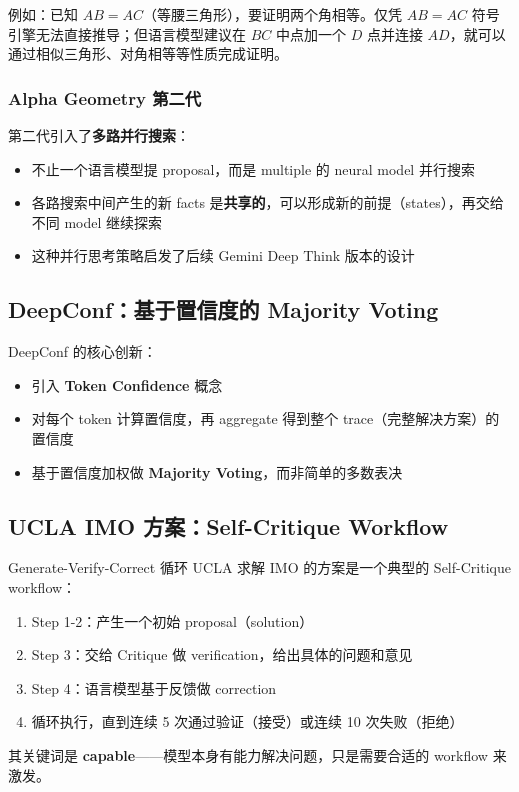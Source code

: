 \documentclass[a4paper]{article}
\begin{document}
例如：已知 $AB = AC$（等腰三角形），要证明两个角相等。仅凭 $AB = AC$ 符号引擎无法直接推导；但语言模型建议在 $BC$ 中点加一个 $D$ 点并连接 $AD$，就可以通过相似三角形、对角相等等性质完成证明。

\subsubsection{Alpha Geometry 第二代}

第二代引入了\textbf{多路并行搜索}：
\begin{itemize}
    \item 不止一个语言模型提 proposal，而是 multiple 的 neural model 并行搜索
    \item 各路搜索中间产生的新 facts 是\textbf{共享的}，可以形成新的前提（states），再交给不同 model 继续探索
    \item 这种并行思考策略启发了后续 Gemini Deep Think 版本的设计
\end{itemize}

\subsection{DeepConf：基于置信度的 Majority Voting}

DeepConf 的核心创新：
\begin{itemize}
    \item 引入 \textbf{Token Confidence} 概念
    \item 对每个 token 计算置信度，再 aggregate 得到整个 trace（完整解决方案）的置信度
    \item 基于置信度加权做 \textbf{Majority Voting}，而非简单的多数表决
\end{itemize}

\subsection{UCLA IMO 方案：Self-Critique Workflow}

\begin{importantbox}{Generate-Verify-Correct 循环}
UCLA 求解 IMO 的方案是一个典型的 Self-Critique workflow：
\begin{enumerate}
    \item Step 1-2：产生一个初始 proposal（solution）
    \item Step 3：交给 Critique 做 verification，给出具体的问题和意见
    \item Step 4：语言模型基于反馈做 correction
    \item 循环执行，直到连续 5 次通过验证（接受）或连续 10 次失败（拒绝）
\end{enumerate}
其关键词是 \textbf{capable}——模型本身有能力解决问题，只是需要合适的 workflow 来激发。
\end{importantbox}
\end{document}
